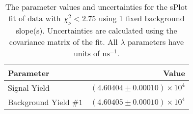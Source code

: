 
\begin{table}
    \begin{center}
        \begin{tabular}{lr}\toprule
            Parameter & Value \\\midrule
            Signal Yield & $(4.60404 \pm 0.00010) \times 10^{4}$ \\
            Background Yield $\#1$ & $(4.60405 \pm 0.00010) \times 10^{4}$ \\\bottomrule
        \end{tabular}
        \caption{The parameter values and uncertainties for the sPlot fit of data with $\chi^2_\nu < 2.75$ using 1 fixed background slope(s). Uncertainties are calculated using the covariance matrix of the fit. All $\lambda$ parameters have units of $\si{\nano\second}^{-1}$.}
    \end{center}
\end{table}
